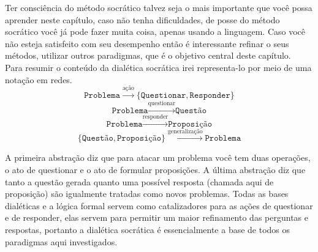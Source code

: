 \documentclass[10pt,a4paper]{report}
\begin{document}


Ter consciência do método socrático talvez seja o mais importante que você possa aprender neste capítulo, caso não tenha dificuldades, de posse do método socrático você já pode fazer muita coisa, apenas usando a linguagem. Caso você não esteja satisfeito com seu desempenho então é interessante refinar o seus métodos, utilizar outros paradigmas, que é o objetivo central deste capítulo.\\

Para resumir o conteúdo da dialética socrática irei representa-lo por meio de uma notação em redes.\\

$$ \texttt{Problema} \overset{\text{ação}}{\rightarrow} \{ \texttt{Questionar} , \texttt{Responder} \} $$ 
$$ \texttt{Problema} \overset{\text{questionar}}{\rightarrow} \texttt{Questão} $$ 
$$ \texttt{Problema} \overset{\text{responder}}{\rightarrow} \texttt{Proposição} $$ 
$$ \{ \texttt{Questão} , \texttt{Proposição} \} \overset{\text{generalização}}{\rightarrow} \texttt{Problema} $$

\hspace{\baselineskip}

A primeira abstração diz que para atacar um problema você tem duas operações, o ato de questionar e o ato de formular proposições. A última abstração diz que tanto a questão gerada quanto uma possível resposta (chamada aqui de proposição) são igualmente tratadas como novos problemas. Todas as bases dialéticas e a lógica formal servem como catalizadores para as ações de questionar e de responder, elas servem para permitir um maior refinamento das perguntas e respostas, portanto a dialética socrática é essencialmente a base de todos os paradigmas aqui investigados.
\end{document}
